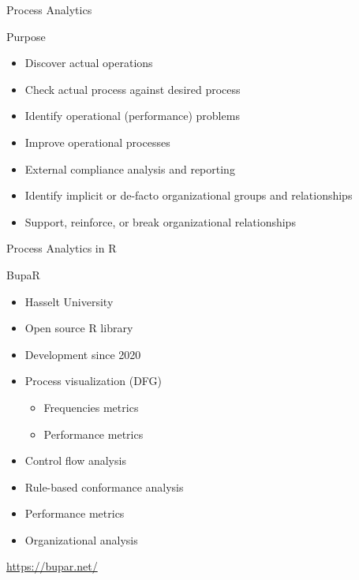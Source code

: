 \documentclass[ignorenonframetext,xcolor=x11names]{beamer}
\begin{document}
\begin{frame}{Process Analytics}
\begin{block}{Purpose}
\begin{itemize}
   \item Discover actual operations
   \item Check actual process against desired process
   \item Identify operational (performance) problems
   \item Improve operational processes
   \item External compliance analysis and reporting
   \item Identify implicit or de-facto organizational groups and relationships 
   \item Support, reinforce, or break organizational relationships
\end{itemize}
\end{block}
\end{frame}

\begin{frame}{Process Analytics in R}
\begin{block}{BupaR}
\begin{itemize}
   \item Hasselt University
   \item Open source R library
   \item Development since 2020
   \item Process visualization (DFG)
   \begin{itemize}
      \item Frequencies metrics
      \item Performance metrics
   \end{itemize}
   \item Control flow analysis
   \item Rule-based conformance analysis
   \item Performance metrics
   \item Organizational analysis
\end{itemize}
\end{block}
\vspace{.5\baselineskip}
\url{https://bupar.net/}

\end{frame}
\end{document}
